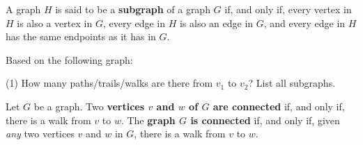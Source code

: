 \documentclass[../mathNotesPreamble]{subfiles}
\begin{document}
  \begin{defn*}
    A graph $H$ is said to be a \textbf{subgraph} of a graph $G$ if, and only if, every vertex in $H$ is also a vertex in $G$, every edge in $H$ is also an edge in $G$, and every edge in $H$ has the same endpoints as it has in $G$.
  \end{defn*}
  \begin{ex*}
    Based on the following graph:
    \begin{center}
    \end{center}
    \begin{extasks}[after-item-skip=\stretch{1}](1)
      \task How many paths/trails/walks are there from $v_1$ to $v_2$?
      \task List all subgraphs.
    \end{extasks}
  \end{ex*}
  \pagebreak

  \begin{defn*}
    Let $G$ be a graph. Two \textbf{vertices $v$ and $w$ of $G$ are connected} if, and only if, there is a walk from $v$ to $w$. The \textbf{graph $G$ is connected} if, and only if, given \emph{any} two vertices $v$ and $w$ in $G$, there is a walk from $v$ to $w$.
  \end{defn*}
\end{document}
